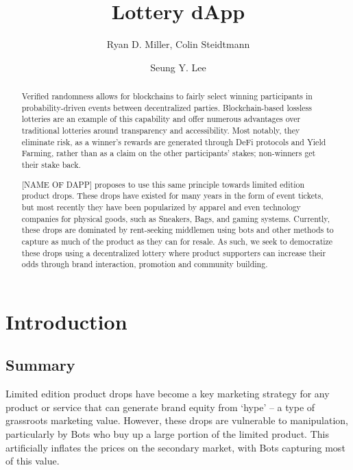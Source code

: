 \documentclass[runningheads]{llncs}
\begin{document}
%
\title{Lottery dApp}%
%
%
\author{Ryan D. Miller, Colin Steidtmann \and Seung Y. Lee}
%
%
%
\maketitle              %
%

\begin{abstract}
Verified randomness allows for blockchains to fairly select winning participants in probability-driven events between decentralized parties.  Blockchain-based lossless lotteries are an example of this capability and offer numerous advantages over traditional lotteries around transparency and accessibility.  Most notably, they eliminate risk, as a winner’s rewards are generated through DeFi protocols and Yield Farming, rather than as a claim on the other participants' stakes; non-winners get their stake back.

[NAME OF DAPP] proposes to use this same principle towards limited edition product drops.  These drops have existed for many years in the form of event tickets, but most recently they have been popularized by apparel and even technology companies for physical goods, such as Sneakers, Bags, and gaming systems.  Currently, these drops are dominated by rent-seeking middlemen using bots and other methods to capture as much of the product as they can for resale.  As such, we seek to democratize these drops using a decentralized lottery where product supporters can increase their odds through brand interaction, promotion and community building.


\end{abstract}
%
%
%
\section{Introduction}\label{intro-sec}

\subsection{Summary}
Limited edition product drops have become a key marketing strategy for any product or service that can generate brand equity from ‘hype’ – a type of grassroots marketing value.  However, these drops are vulnerable to manipulation, particularly by Bots who buy up a large portion of the limited product.  This artificially inflates the prices on the secondary market, with Bots capturing most of this value.  
\end{document}
